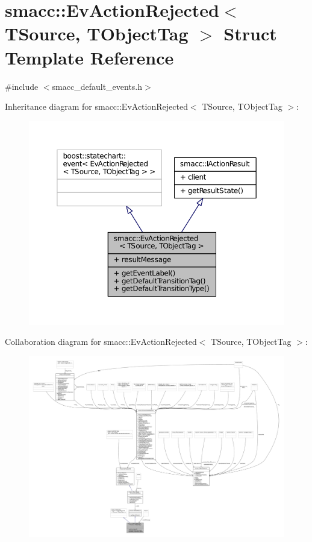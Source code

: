 \hypertarget{structsmacc_1_1EvActionRejected}{}\section{smacc\+:\+:Ev\+Action\+Rejected$<$ T\+Source, T\+Object\+Tag $>$ Struct Template Reference}
\label{structsmacc_1_1EvActionRejected}


{\ttfamily \#include $<$smacc\+\_\+default\+\_\+events.\+h$>$}



Inheritance diagram for smacc\+:\+:Ev\+Action\+Rejected$<$ T\+Source, T\+Object\+Tag $>$\+:
\nopagebreak
\begin{figure}[H]
\begin{center}
\leavevmode
\includegraphics[width=350pt]{structsmacc_1_1EvActionRejected__inherit__graph}
\end{center}
\end{figure}


Collaboration diagram for smacc\+:\+:Ev\+Action\+Rejected$<$ T\+Source, T\+Object\+Tag $>$\+:
\nopagebreak
\begin{figure}[H]
\begin{center}
\leavevmode
\includegraphics[width=350pt]{structsmacc_1_1EvActionRejected__coll__graph}
\end{center}
\end{figure}
